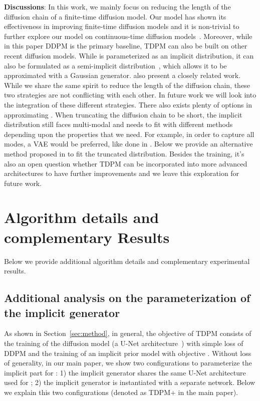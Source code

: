 \documentclass{article} \usepackage{iclr2023_conference,times}
\theoremstyle{plain}
\theoremstyle{definition}
\theoremstyle{remark}
\begin{document}
{\textbf{Discussions}: 
In this work, we mainly focus on reducing the length of the diffusion chain of a finite-time diffusion model. Our model has shown its effectiveness in improving finite-time diffusion models and it is non-trivial to further explore our model on continuous-time diffusion models~\citep{song2021scorebased}. Moreover, while in this paper DDPM is the primary baseline, TDPM can also be built on other recent diffusion models. While  is parameterized as an implicit distribution, it can also be formulated as a semi-implicit distribution~\citep{yin2018semi}, which allows it to be approximated with a Gaussian generator. \citet{xiao2021tackling} also present a closely related work. While we share the same spirit to reduce the length of the diffusion chain, these two strategies are not conflicting with each other. In future work we will look into the integration of these different strategies. {There also exists plenty of options in approximating . When truncating the diffusion chain to be short, the implicit distribution still faces multi-modal and needs to fit with different methods depending upon the properties that we need. For example, in order to capture all modes, a VAE would be preferred, like done in \citet{pandey2022diffusevae}. Below we provide an alternative method proposed in \citet{zheng2021exploiting} to fit the truncated distribution. Besides the training, it’s also an open question whether TDPM can be incorporated into more advanced architectures to have further improvements and we leave this exploration for future work. 
}

\section{Algorithm details and complementary Results}\label{appendix:results}
Below we provide additional algorithm details and complementary experimental results. 

\subsection{Additional analysis on the parameterization of the implicit generator}

As shown in Section~\ref{sec:method}, in general, the objective of TDPM consists of the training of the diffusion model  (a U-Net architecture~\citep{ronneberger2015u}) with simple loss of DDPM  and the training of an implicit prior model  with objective . Without loss of generality, in our main paper, we show two configurations  to parameterize the implicit part for : 1) the implicit generator shares the same U-Net architecture used for  ; 2) the implicit generator is instantiated with a separate network. Below we explain this two configurations (denoted as TDPM+ in the main paper).


}
\end{document}
